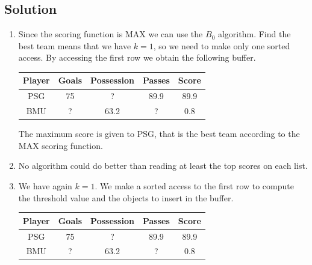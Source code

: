 \documentclass[12pt, a4paper]{report}
\newtheorem[style=M,bodystyle=\normalfont]{theorem}{Theorem}
\newtheorem[style=M,bodystyle=\normalfont]{corollary}{Corollary}
\newtheorem[style=M,bodystyle=\normalfont]{lemma}{Lemma}
\newtheorem[style=M,bodystyle=\normalfont]{definition}{Definition}
\begin{document}
    \subsection*{Solution}
        \begin{enumerate}
            \item Since the scoring function is MAX we can use the $B_0$ algorithm. Find the best team means that we have $k=1$, so we 
                need to make only one sorted access. By accessing the first row we obtain the following buffer. 
                \begin{table}[H]
                    \centering
                    \begin{tabular}{c|ccc|c}
                    \hline
                    \textbf{Player} & \textbf{Goals} & \textbf{Possession} & \textbf{Passes} & \textbf{Score} \\ \hline
                    PSG             & 75             & ?                   & 89.9            & 89.9           \\
                    BMU             & ?              & 63.2                & ?               & 0.8            \\ \hline
                    \end{tabular}
                \end{table}
                The maximum score is given to PSG, that is the best team according to the MAX scoring function. 
            \item No algorithm could do better than reading at least the top scores on each list. 
            \item We have again $k=1$. We make a sorted access to the first row to compute the threshold value and 
                the objects to insert in the buffer. 
                \begin{table}[H]
                    \centering
                    \begin{tabular}{c|ccc|c}
                    \hline
                    \textbf{Player} & \textbf{Goals} & \textbf{Possession} & \textbf{Passes} & \textbf{Score} \\ \hline
                    PSG             & 75             & ?                   & 89.9            & 89.9           \\
                    BMU             & ?              & 63.2                & ?               & 0.8            \\ \hline
                    \end{tabular}
                \end{table}

\end{enumerate}
\end{document}
